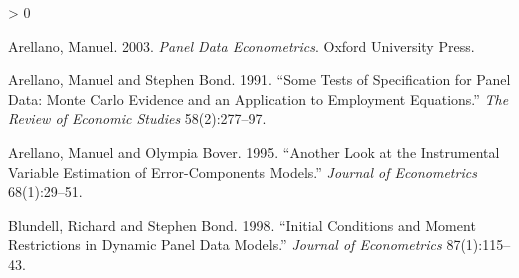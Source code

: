 \documentclass[
  12pt,
]{article}
\newlength{\cslhangindent}
\newenvironment{CSLReferences}[2] %
 {%
  \setlength{\parindent}{0pt}
  \ifodd #1 \everypar{\setlength{\hangindent}{\cslhangindent}}\ignorespaces\fi
  \ifnum #2 > 0
  \setlength{\parskip}{#2\baselineskip}
  \fi
 }%
 {}
\begin{document}
\hypertarget{refs}{}
\begin{CSLReferences}{1}{0}
\leavevmode\hypertarget{ref-arellano2003panel}{}%
Arellano, Manuel. 2003. \emph{Panel Data Econometrics}. Oxford University Press.

\leavevmode\hypertarget{ref-arellano1991some}{}%
Arellano, Manuel and Stephen Bond. 1991. {``Some Tests of Specification for Panel Data: Monte Carlo Evidence and an Application to Employment Equations.''} \emph{The Review of Economic Studies} 58(2):277--97.

\leavevmode\hypertarget{ref-arellano1995another}{}%
Arellano, Manuel and Olympia Bover. 1995. {``Another Look at the Instrumental Variable Estimation of Error-Components Models.''} \emph{Journal of Econometrics} 68(1):29--51.

\leavevmode\hypertarget{ref-bb98}{}%
Blundell, Richard and Stephen Bond. 1998. {``Initial Conditions and Moment Restrictions in Dynamic Panel Data Models.''} \emph{Journal of Econometrics} 87(1):115--43.

\end{CSLReferences}
\end{document}
